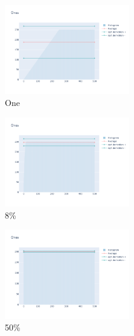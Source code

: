 \documentclass[12pt, fleqn]{report}                             %
\theoremstyle{break}                                            %
\begin{document}
      \begin{figure}[ht!]
        \centering
        \begin{subfigure}[b]{0.4\linewidth}
          \includegraphics[width=0.6\textwidth]{Images/178/dia-a.png}
          \caption{One}
        \end{subfigure}
        \begin{subfigure}[b]{0.4\linewidth}
          \includegraphics[width=0.6\textwidth]{Images/178/dia-b.png}
          \caption{8\%}
        \end{subfigure}
        \begin{subfigure}[b]{0.4\linewidth}
          \includegraphics[width=0.6\textwidth]{Images/178/dia-c.png}
          \caption{50\%}
        \end{subfigure}
        \begin{subfigure}[b]{0.4\linewidth}

\end{subfigure}
\end{figure}
\end{document}
